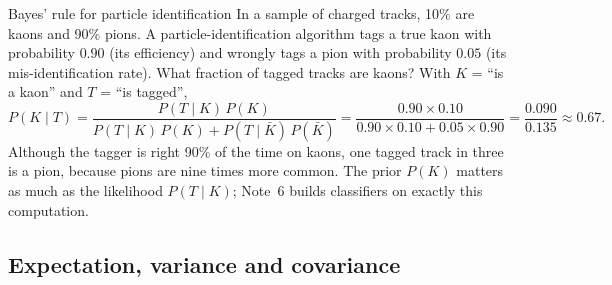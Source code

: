 \documentclass[11pt]{article}
\begin{document}
\begin{worked}{Bayes' rule for particle identification}
In a sample of charged tracks, 10\% are kaons and 90\% pions. A particle-identification algorithm tags a true kaon
with probability $0.90$ (its efficiency) and wrongly tags a pion with probability $0.05$ (its mis-identification
rate). What fraction of tagged tracks are kaons? With $K$ = ``is a kaon'' and $T$ = ``is tagged'',
\[
  P(K \mid T) = \frac{P(T \mid K)\,P(K)}{P(T \mid K)\,P(K) + P(T \mid \bar K)\,P(\bar K)}
  = \frac{0.90 \times 0.10}{0.90 \times 0.10 + 0.05 \times 0.90} = \frac{0.090}{0.135} \approx 0.67 .
\]
Although the tagger is right 90\% of the time on kaons, one tagged track in three is a pion, because pions are nine
times more common. The prior $P(K)$ matters as much as the likelihood $P(T \mid K)$; Note~6 builds classifiers on
exactly this computation.
\end{worked}

\subsection{Expectation, variance and covariance}\label{sec:moments}
\end{document}
